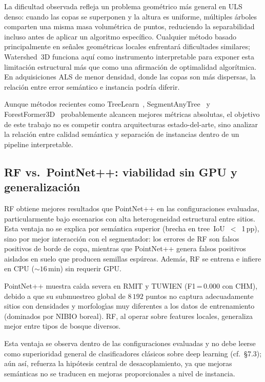 \documentclass[runningheads]{llncs}
\begin{document}
La dificultad observada refleja un problema geométrico más general en ULS denso: cuando las copas se superponen y la altura es uniforme, múltiples árboles comparten una misma masa volumétrica de puntos, reduciendo la separabilidad incluso antes de aplicar un algoritmo específico. Cualquier método basado principalmente en señales geométricas locales enfrentará dificultades similares; Watershed~3D funciona aquí como instrumento interpretable para exponer esta limitación estructural más que como una afirmación de optimalidad algorítmica. En adquisiciones ALS de menor densidad, donde las copas son más dispersas, la relación entre error semántico e instancia podría diferir.

Aunque métodos recientes como TreeLearn~\cite{henrich2024}, SegmentAnyTree~\cite{wielgosz2024} y ForestFormer3D~\cite{xiang2025} probablemente alcancen mejores métricas absolutas, el objetivo de este trabajo no es competir contra arquitecturas estado-del-arte, sino analizar la relación entre calidad semántica y separación de instancias dentro de un pipeline interpretable.

\subsection{RF vs.\ PointNet++: viabilidad sin GPU y generalizaci\'on}

RF obtiene mejores resultados que PointNet++ en las configuraciones evaluadas, particularmente bajo escenarios con alta heterogeneidad estructural entre sitios. Esta ventaja no se explica por sem\'antica superior (brecha en tree~IoU~$<$~1\,pp), sino por mejor interacci\'on con el segmentador: los errores de RF son falsos positivos de borde de copa, mientras que PointNet++ genera falsos positivos aislados en suelo que producen semillas esp\'ureas. Adem\'as, RF se entrena e infiere en CPU (${\sim}16$\,min) sin requerir GPU.

PointNet++ muestra ca\'\i{}da severa en RMIT y TUWIEN (F1\,=\,0.000 con CHM), debido a que su submuestreo global de $8\,192$ puntos no captura adecuadamente sitios con densidades y morfolog\'\i{}as muy diferentes a los datos de entrenamiento (dominados por NIBIO boreal). RF, al operar sobre features locales, generaliza mejor entre tipos de bosque diversos.

Esta ventaja se observa dentro de las configuraciones evaluadas y no debe leerse como superioridad general de clasificadores clásicos sobre deep learning (cf.\ §7.3); aún así, refuerza la hipótesis central de desacoplamiento, ya que mejoras semánticas no se traducen en mejoras proporcionales a nivel de instancia.
\end{document}
